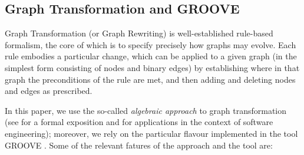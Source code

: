 \documentclass[sn-mathphys-num,a4paper,iicol,lineno,pdflatex]{sn-jnl-hacked}
\theoremstyle{thmstyleone}%
\theoremstyle{thmstyletwo}%
\theoremstyle{thmstylethree}%
\begin{document}
\subsection{Graph Transformation and GROOVE}

Graph Transformation (or Graph Rewriting) is well-established rule-based formalism, the core of which is to specify precisely how graphs may evolve. Each rule embodies a particular change, which can be applied to a given graph (in the simplest form consisting of nodes and binary edges) by establishing where in that graph the preconditions of the rule are met, and then adding and deleting nodes and edges as prescribed.

In this paper, we use the so-called \emph{algebraic approach} to graph transformation (see \cite{EhrigEtAl} for a formal exposition and \cite{HeckelTaentzer} for applications in the context of software engineering); moreover, we rely on the particular flavour implemented in the tool GROOVE \cite{GROOVE}. Some of the relevant fatures of the approach and the tool are:
%
\end{document}
